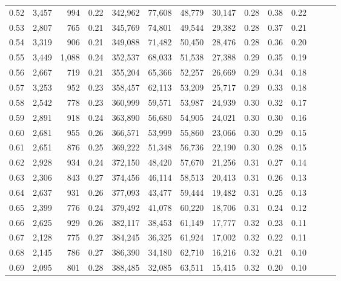 \begin{tabular}{rrrrrrrrrrrrrr}
0.52 &   3,457 &    994 &  0.22 &  342,962 &   77,608 &  48,779 &  30,147 &  0.28 &  0.38 &      0.22 \\
0.53 &   2,807 &    765 &  0.21 &  345,769 &   74,801 &  49,544 &  29,382 &  0.28 &  0.37 &      0.21 \\
0.54 &   3,319 &    906 &  0.21 &  349,088 &   71,482 &  50,450 &  28,476 &  0.28 &  0.36 &      0.20 \\
0.55 &   3,449 &  1,088 &  0.24 &  352,537 &   68,033 &  51,538 &  27,388 &  0.29 &  0.35 &      0.19 \\
0.56 &   2,667 &    719 &  0.21 &  355,204 &   65,366 &  52,257 &  26,669 &  0.29 &  0.34 &      0.18 \\
0.57 &   3,253 &    952 &  0.23 &  358,457 &   62,113 &  53,209 &  25,717 &  0.29 &  0.33 &      0.18 \\
0.58 &   2,542 &    778 &  0.23 &  360,999 &   59,571 &  53,987 &  24,939 &  0.30 &  0.32 &      0.17 \\
0.59 &   2,891 &    918 &  0.24 &  363,890 &   56,680 &  54,905 &  24,021 &  0.30 &  0.30 &      0.16 \\
0.60 &   2,681 &    955 &  0.26 &  366,571 &   53,999 &  55,860 &  23,066 &  0.30 &  0.29 &      0.15 \\
0.61 &   2,651 &    876 &  0.25 &  369,222 &   51,348 &  56,736 &  22,190 &  0.30 &  0.28 &      0.15 \\
0.62 &   2,928 &    934 &  0.24 &  372,150 &   48,420 &  57,670 &  21,256 &  0.31 &  0.27 &      0.14 \\
0.63 &   2,306 &    843 &  0.27 &  374,456 &   46,114 &  58,513 &  20,413 &  0.31 &  0.26 &      0.13 \\
0.64 &   2,637 &    931 &  0.26 &  377,093 &   43,477 &  59,444 &  19,482 &  0.31 &  0.25 &      0.13 \\
0.65 &   2,399 &    776 &  0.24 &  379,492 &   41,078 &  60,220 &  18,706 &  0.31 &  0.24 &      0.12 \\
0.66 &   2,625 &    929 &  0.26 &  382,117 &   38,453 &  61,149 &  17,777 &  0.32 &  0.23 &      0.11 \\
0.67 &   2,128 &    775 &  0.27 &  384,245 &   36,325 &  61,924 &  17,002 &  0.32 &  0.22 &      0.11 \\
0.68 &   2,145 &    786 &  0.27 &  386,390 &   34,180 &  62,710 &  16,216 &  0.32 &  0.21 &      0.10 \\
0.69 &   2,095 &    801 &  0.28 &  388,485 &   32,085 &  63,511 &  15,415 &  0.32 &  0.20 &      0.10 \\

\end{tabular}

